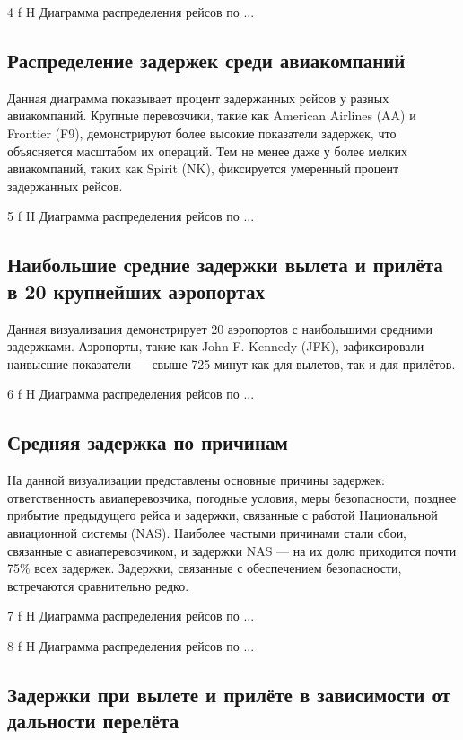 {4}
{f}
{H}
{\textwidth}
{Диаграмма распределения рейсов по ...}


\subsection{Распределение задержек среди авиакомпаний}

Данная диаграмма показывает процент задержанных рейсов у разных авиакомпаний.
Крупные перевозчики, такие как American Airlines (AA) и Frontier (F9), демонстрируют более высокие показатели задержек, что объясняется масштабом их операций.
Тем не менее даже у более мелких авиакомпаний, таких как Spirit (NK), фиксируется умеренный процент задержанных рейсов.

{5}
{f}
{H}
{\textwidth}
{Диаграмма распределения рейсов по ...}

\subsection{Наибольшие средние задержки вылета и прилёта в 20 крупнейших аэропортах}

Данная визуализация демонстрирует 20 аэропортов с наибольшими средними задержками.
Аэропорты, такие как John F. Kennedy (JFK), зафиксировали наивысшие показатели — свыше 725 минут как для вылетов, так и для прилётов.

{6}
{f}
{H}
{\textwidth}
{Диаграмма распределения рейсов по ...}


\subsection{Средняя задержка по причинам}

На данной визуализации представлены основные причины задержек: ответственность авиаперевозчика, погодные условия, меры безопасности, позднее прибытие предыдущего рейса и задержки, связанные с работой Национальной авиационной системы (NAS).
Наиболее частыми причинами стали сбои, связанные с авиаперевозчиком, и задержки NAS — на их долю приходится почти 75\% всех задержек.
Задержки, связанные с обеспечением безопасности, встречаются сравнительно редко.

{7}
{f}
{H}
{\textwidth}
{Диаграмма распределения рейсов по ...}

{8}
{f}
{H}
{\textwidth}
{Диаграмма распределения рейсов по ...}


\subsection{Задержки при вылете и прилёте в зависимости от дальности перелёта}


